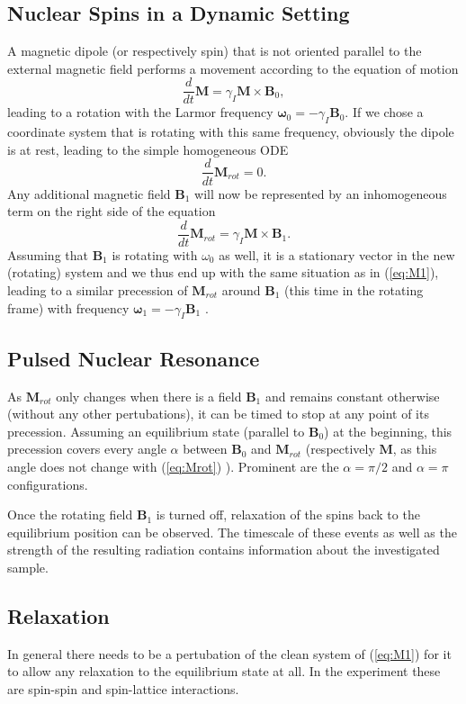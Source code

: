 \documentclass[a4paper]{scrartcl}
\numberwithin{equation}{section}
\numberwithin{figure}{section}
\numberwithin{table}{section}
\newcommand{\eq}[2]{\begin{equation}#1\label{#2}\end{equation}}
\newcommand{\ve}[1]{\mathbf{ #1} }
\begin{document}
\subsection{Nuclear Spins in a Dynamic Setting}
A magnetic dipole (or respectively spin) that is not oriented parallel to the external magnetic field performs a movement according to the equation of motion
\eq{\frac{d}{dt}\ve M = \gamma_I \ve M \times \ve B_0 ,}{eq:M1}
leading to a rotation with the Larmor frequency $\ve \omega_0 = -\gamma_I \ve B_0$. If we chose a coordinate system that is rotating with this same frequency, obviously the dipole is at rest, leading to the simple homogeneous ODE
\eq{\frac{d}{dt}\ve M_{rot} = 0.}{eq:Mrot}
Any additional magnetic field $\ve B_1$ will now be represented by an inhomogeneous term on the right side of the equation
\eq{\frac{d}{dt}\ve M_{rot} = \gamma_I \ve M \times \ve B_1.}{}
Assuming that $\ve B_1$ is rotating with $\omega_0$ as well, it is a stationary vector in the new (rotating) system and we thus end up with the same situation as in (\ref{eq:M1}), leading to a similar precession of $\ve M_{rot}$ around $\ve B_1$ (this time in the rotating frame) with frequency $\ve \omega_1 = -\gamma_I \ve B_1$ \cite{carrington} .


\subsection{Pulsed Nuclear Resonance}
As $\ve M_{rot}$ only changes when there is a field $\ve B_1$ and remains constant otherwise (without any other pertubations), it can be timed to stop at any point of its precession. Assuming an equilibrium state (parallel to $\ve B_0$) at the beginning, this precession covers every angle $\alpha$ between $\ve B_0$ and $\ve M_{rot}$ (respectively $\ve M$, as this angle does not change with (\ref{eq:Mrot}) ). Prominent are the $\alpha = \pi/2$ and $\alpha = \pi$ configurations.

Once the rotating field $\ve B_1$ is turned off, relaxation of the spins back to the equilibrium position can be observed. The timescale of these events as well as the strength of the resulting radiation contains information about the investigated sample.


\subsection{Relaxation}
\label{sec:relax}
In general there needs to be a pertubation of the clean system of (\ref{eq:M1}) for it to allow any relaxation to the equilibrium state at all. In the experiment these are spin-spin and spin-lattice interactions.
\end{document}
